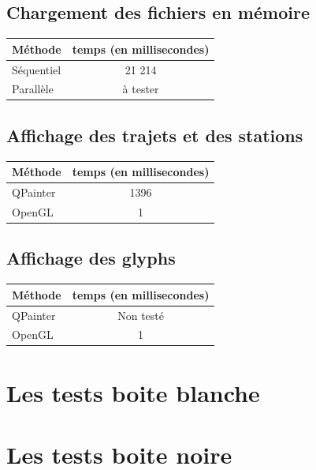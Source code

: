 \documentclass[12pt]{article}
\begin{document}
		\subsection{Chargement des fichiers en mémoire}
		
		\begin{center}
			\begin{tabular}{| l | c |}
			\hline
			\textbf{Méthode} & \textbf{temps (en millisecondes)} \\ \hline
			Séquentiel & 21 214 \\ \hline
			Parallèle & à tester \\ \hline
		    \end{tabular}
	    \end{center}
		
		\subsection{Affichage des trajets et des stations}
		\begin{center}
			\begin{tabular}{| l | c |}
			\hline
			\textbf{Méthode} & \textbf{temps (en millisecondes)} \\ \hline
			QPainter & 1396 \\ \hline
			OpenGL & 1 \\ \hline
		    \end{tabular}
	    \end{center}
	    	    
		\subsection{Affichage des glyphs}
		\begin{center}
			\begin{tabular}{| l | c |}
			\hline
			\textbf{Méthode} & \textbf{temps (en millisecondes)} \\ \hline
			QPainter & Non testé\\ \hline
			OpenGL & 1 \\ \hline
		    \end{tabular}
	    \end{center}
		
	\section{Les tests boite blanche}
	
	\section{Les tests boite noire}
	
\end{document}
